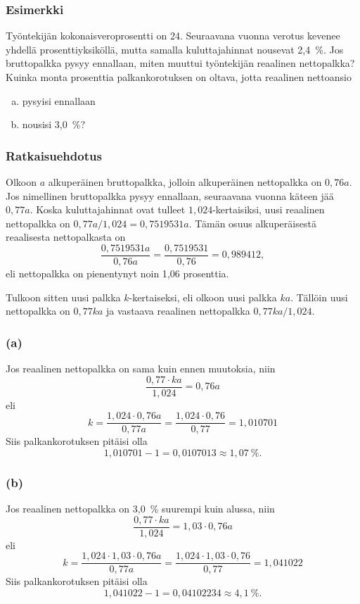 \documentclass[]{article}\usepackage[]{graphicx}\usepackage[]{color}
\theoremstyle{remark}
\begin{document}
	\begin{frame}
		\frametitle{Esimerkki}
			Työntekijän kokonaisveroprosentti on 24. Seuraavana vuonna verotus kevenee yhdellä prosenttiyksiköllä, mutta samalla kuluttajahinnat nousevat 2,4~\%. Jos bruttopalkka pysyy ennallaan, miten muuttui työntekijän reaalinen nettopalkka? Kuinka monta prosenttia 
			palkankorotuksen on oltava, jotta reaalinen nettoansio 
			\begin{enumerate}[(a)]
				\item pysyisi ennallaan
				\item nousisi 3,0~\%?
			\end{enumerate}
		\end{frame}

		\begin{frame}
			\frametitle{Ratkaisuehdotus}
			Olkoon \(a\) alkuperäinen bruttopalkka, jolloin alkuperäinen nettopalkka on \(0,76a\). \pause Jos nimellinen bruttopalkka pysyy ennallaan, seuraavana vuonna käteen jää \(0,77a\). \pause Koska kuluttajahinnat ovat tulleet \(1,024\)-kertaisiksi, uusi reaalinen nettopalkka on \(0,77a/1,024 = 0{,}7519531a\). \pause Tämän osuus alkuperäisestä reaalisesta nettopalkasta on
			\[
				\frac{0{,}7519531a}{0,76a} = \frac{0{,}7519531}{0,76} = 0{,}989412,
			\]
			\pause eli nettopalkka on pienentynyt noin 1{,}06 prosenttia.
		\end{frame}

		\begin{frame}
			Tulkoon sitten uusi palkka \(k\)-kertaiseksi, eli olkoon uusi palkka \(ka\). \pause Tällöin uusi nettopalkka on \(0,77ka\) ja vastaava reaalinen nettopalkka \(0,77ka/1,024\).
		\end{frame}

		\begin{frame}
			\frametitle{(a)}
			Jos  reaalinen nettopalkka on sama kuin ennen muutoksia, niin
			\[
				\frac{0,77\cdot ka}{1,024} = 0,76a
			\]
			eli
			\[
				k = \frac{1,024 \cdot 0,76a}{0,77a} = \frac{1,024\cdot0,76}{0,77} = 1{,}010701
			\]
			Siis palkankorotuksen pitäisi olla 
			\[
				1{,}010701 - 1 = 0{,}0107013 \approx 1{,}07~\%.
			\]
		\end{frame}

		\begin{frame}
			\frametitle{(b)}
			Jos reaalinen nettopalkka on 3,0~\% suurempi kuin alussa, niin
			\[
				\frac{0,77\cdot ka}{1,024} = 1,03\cdot0,76a
			\]
			eli
			\[
				k = \frac{1,024 \cdot 1,03\cdot 0,76a}{0,77a} = \frac{1,024\cdot1,03\cdot 0,76}{0,77} = 1{,}041022
			\]
			Siis palkankorotuksen pitäisi olla 
			\[
				1{,}041022 - 1 = 0{,}04102234 \approx 4{,}1~\%.
			\]
		\end{frame}
\end{document}
